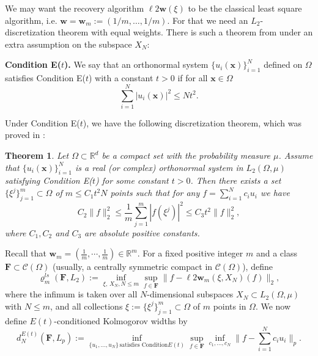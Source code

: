 \documentclass[12pt]{article}
\def\C{{\mathcal C}}
\def\R{{\mathbb R}}
\def\Og{\Omega}
\def\bx{\mathbf x}
\def\bw{\mathbf w}
\def\bF{\mathbf F}
\def\Og{\Omega}
\newtheorem{Theorem}{Theorem}[section]
\numberwithin{equation}{section}
\begin{document}
 We may want  the recovery algorithm $\ell 2 \bw(\xi)$ to be the  classical least square 
algorithm, i.e. $\bw=\bw_m:=(1/m,\dots,1/m)$.
For that we need an $L_2$- discretization theorem with equal weights.
 There is such a theorem from \cite{LT}
under an extra assumption on the subspace $X_N$:

{\bf Condition E($t$).} We say that an orthonormal system $\{u_i(\bx)\}_{i=1}^N$ defined on $\Omega$ satisfies Condition E($t$) with a constant $t>0$ if for all $\bx\in \Omega$
$$
\sum_{i=1}^N |u_i(\bx)|^2 \le Nt^2.
$$

Under Condition E($t$), we have the following discretization  theorem, which was proved in  \cite{LT}:

\begin{Theorem}\label{CT2} Let  $\Omega\subset \R^d$ be a compact set with the probability measure $\mu$. Assume that $\{u_i(\bx)\}_{i=1}^N$ is a real (or complex) orthonormal system in $L_2(\Omega,\mu)$ satisfying Condition E($t$) for some constant $t>0$. 
	Then  there exists a set $\{\xi^j\}_{j=1}^m\subset \Omega$ of $m \le C_1 t^2 N$ points such that for any $f=\sum_{i=1}^N c_iu_i$  we have  
	\begin{equation*}
	C_2 \|f\|_2^2 \le \frac{1}{m}\sum_{j=1}^m |f(\xi^j)|^2 \le C_3 t^2\|f\|_2^2, 
	\end{equation*}
	where $C_1, C_2$ and $C_3$ are absolute positive constants. 
\end{Theorem}























 
 
 





Recall that  $\bw_m=(\frac1m,\cdots, \frac1m) \in\mathbb{R}^m$. 
 For a fixed positive integer $m$ and  a class $\bF\subset \C(\Og)$ (usually, a centrally symmetric compact in $\C(\Og)$), define
$$
\varrho_m^{ls}(\bF,L_2) := \inf_{\xi,\,X_N, N\leq m} \sup_{f\in \bF} \|f-\ell 2 \bw_m(\xi,X_N)(f)\|_2,
$$
where     the infimum is   taken over all  $N$-dimensional subspaces $X_N\subset L_2(\Og, \mu)$ with $N\leq m$, and  all collections $\xi:=\{\xi^j\}_{j=1}^m\subset \Omega$ of $m$ 
points in $\Og$.
We now define $E(t)$-conditioned Kolmogorov widths by 
$$
d_N^{E(t)}(\bF,L_p) :=     \inf_{\{u_1,\dots,u_N\}\, \text{satisfies Condition} E(t)}   \sup_{f\in \bF}\inf_{c_1,\dots,c_N}\|f-\sum_{i=1}^N c_iu_i\|_p.
$$
\end{document}
